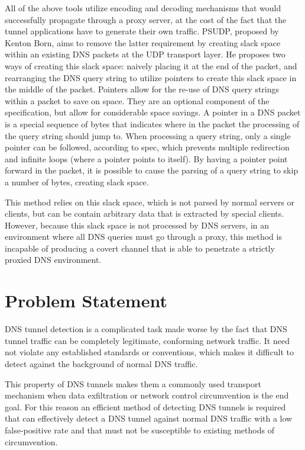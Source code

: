 \documentclass[12pt]{article}
\theoremstyle{remark}
\theoremstyle{definition}
\theoremstyle{definition}
\theoremstyle{definition}
\begin{document}
All of the above tools utilize encoding and decoding mechanisms that would
successfully propagate through a proxy server, at the cost of the fact
that the tunnel applications have to generate their own traffic. PSUDP, proposed
by Kenton Born, aims to remove the latter requirement by creating slack space
within an existing DNS packets at the UDP transport layer. He proposes two ways
of creating this slack space: naively placing it at the end of the packet, and
rearranging the DNS query string to utilize pointers to create this
slack space in the middle of the packet. Pointers allow
for the re-use of DNS query strings within a packet to save on space. They are
an optional component of the specification, but allow for considerable space
savings. A pointer in a DNS packet is a special sequence of bytes that
indicates where in the packet the processing of the query string should jump
to. When processing a query string, only a single pointer can be followed,
according to spec, which prevents multiple redirection and infinite loops
(where a pointer points to itself). By having a pointer point forward in the
packet, it is possible to cause the parsing of a query string to skip a number
of bytes, creating slack space.

This method relies on this slack space, which is not parsed by normal servers
or clients, but can be contain arbitrary data that is extracted by special
clients. However, because this slack space is not processed by DNS servers, in
an environment where all DNS queries must go through a proxy, this method is
incapable of producing a covert channel that is able to penetrate a strictly
proxied DNS environment.

\section{Problem Statement}

DNS tunnel detection is a complicated task made worse by the fact that DNS
tunnel traffic can be completely legitimate, conforming network traffic. It
need not violate any established standards or conventions, which makes it
difficult to detect against the background of normal DNS traffic.

This property of DNS tunnels makes them a commonly used transport mechanism
when data exfiltration or network control circumvention is the end goal. For
this reason an efficient method of detecting DNS tunnels is required that can
effectively detect a DNS tunnel against normal DNS traffic with a low
false-positive rate and that must not be susceptible to existing methods of
circumvention.
\end{document}
